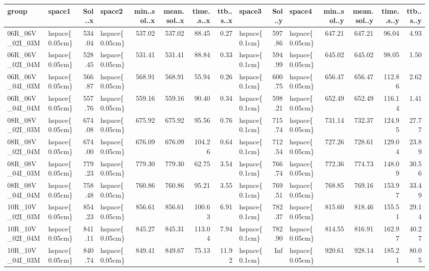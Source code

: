
\begin{tabular}{llrlrrrrlrlrrrr}
\toprule
group & space1 & Sol..x & space2 & min..sol..x & mean.sol..x & time..s..x & ttb..s..x & space3 & Sol..y & space4 & min..sol..y & mean.sol..y & time..s..y & ttb..s..y\\
\midrule
06R\_06V\_02I\_03M & hspace\{0.05cm\} & 534.04 & hspace\{0.05cm\} & 537.02 & 537.02 & 88.45 & 0.27 & hspace\{0.1cm\} & 597.86 & hspace\{0.05cm\} & 647.21 & 647.21 & 96.04 & 4.93\\
06R\_06V\_02I\_04M & hspace\{0.05cm\} & 528.45 & hspace\{0.05cm\} & 531.41 & 531.41 & 88.84 & 0.33 & hspace\{0.1cm\} & 594.99 & hspace\{0.05cm\} & 645.02 & 645.02 & 98.05 & 1.50\\
06R\_06V\_04I\_03M & hspace\{0.05cm\} & 566.87 & hspace\{0.05cm\} & 568.91 & 568.91 & 55.94 & 0.26 & hspace\{0.1cm\} & 600.75 & hspace\{0.05cm\} & 656.47 & 656.47 & 112.86 & 2.62\\
06R\_06V\_04I\_04M & hspace\{0.05cm\} & 557.76 & hspace\{0.05cm\} & 559.16 & 559.16 & 90.40 & 0.34 & hspace\{0.1cm\} & 598.21 & hspace\{0.05cm\} & 652.49 & 652.49 & 116.14 & 1.41\\
\addlinespace
08R\_08V\_02I\_03M & hspace\{0.05cm\} & 674.08 & hspace\{0.05cm\} & 675.92 & 675.92 & 95.56 & 0.76 & hspace\{0.1cm\} & 715.74 & hspace\{0.05cm\} & 731.14 & 732.37 & 124.95 & 27.77\\
08R\_08V\_02I\_04M & hspace\{0.05cm\} & 674.00 & hspace\{0.05cm\} & 676.09 & 676.09 & 104.26 & 0.64 & hspace\{0.1cm\} & 712.54 & hspace\{0.05cm\} & 727.26 & 728.61 & 129.04 & 23.89\\
08R\_08V\_04I\_03M & hspace\{0.05cm\} & 779.23 & hspace\{0.05cm\} & 779.30 & 779.30 & 62.75 & 3.54 & hspace\{0.1cm\} & 766.74 & hspace\{0.05cm\} & 772.36 & 774.73 & 148.09 & 30.56\\
08R\_08V\_04I\_04M & hspace\{0.05cm\} & 758.48 & hspace\{0.05cm\} & 760.86 & 760.86 & 95.21 & 3.55 & hspace\{0.1cm\} & 769.51 & hspace\{0.05cm\} & 768.85 & 769.16 & 153.97 & 33.49\\
\addlinespace
10R\_10V\_02I\_03M & hspace\{0.05cm\} & 854.23 & hspace\{0.05cm\} & 856.61 & 856.61 & 100.63 & 6.91 & hspace\{0.1cm\} & 782.37 & hspace\{0.05cm\} & 815.60 & 818.46 & 155.51 & 29.14\\
10R\_10V\_02I\_04M & hspace\{0.05cm\} & 841.11 & hspace\{0.05cm\} & 845.27 & 845.31 & 113.04 & 7.94 & hspace\{0.1cm\} & 782.90 & hspace\{0.05cm\} & 814.55 & 816.91 & 162.97 & 40.27\\
10R\_10V\_04I\_03M & hspace\{0.05cm\} & 840.74 & hspace\{0.05cm\} & 849.41 & 849.67 & 75.13 & 11.92 & hspace\{0.1cm\} & Inf & hspace\{0.05cm\} & 920.61 & 928.14 & 185.21 & 80.05\\

\end{tabular}
